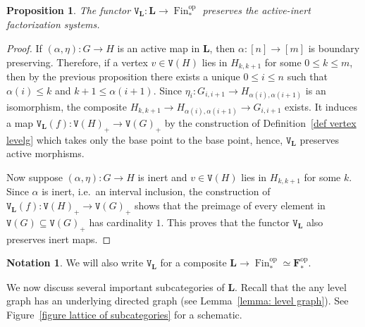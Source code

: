 \documentclass{amsart}
\numberwithin{theorem}{subsection}
\newtheorem{proposition}[theorem]{Proposition}
\theoremstyle{definition}
\newtheorem{notation}[theorem]{Notation}
\providecommand{\op}{\mathrm{op}}
\newcommand{\finset}{\operatorname{Fin}}
\newcommand{\pfinset}{\finset_*}
\newcommand{\finsetskel}{\mathbf{F}}
\newcommand{\pfinsetskel}{\finsetskel_*}
\newcommand{\levelg}{\mathbf{L}}
\newcommand{\vertex}{\mathtt{V}}
\begin{document}
\begin{proposition}\label{prop active inert bbG}
	The functor $\vertex_{\levelg}\colon \levelg\to \pfinset^\op$ preserves the active-inert factorization systems.
\end{proposition}
\begin{proof}
If $(\alpha,\eta)\colon G\to H$ is an active map in $\levelg$, then $\alpha\colon [n]\to [m]$ is boundary preserving.
Therefore, if a vertex $v\in \vertex(H)$ lies in $H_{k, k+1}$ for some $0\leq k\leq m$, then by the previous proposition there exists a unique $0\leq i\leq n$ such that $\alpha(i)\leq k$ and $k+1\leq \alpha(i+1)$.
Since $\eta_i\colon G_{i,i+1}\to H_{\alpha(i), \alpha(i+1)}$ is an isomorphism, the composite $H_{k,k+1}\to H_{\alpha(i), \alpha(i+1)}\to G_{i,i+1}$ exists. It induces a map $\vertex_\levelg(f) \colon \vertex(H)_+ \rightarrow \vertex(G)_+$ by the construction of Definition~\ref{def vertex levelg} which takes only the base point to the base point, hence, $\vertex_{\levelg}$ preserves active morphisms.

Now suppose $(\alpha,\eta)\colon G\to H$ is inert and $v\in \vertex(H)$ lies in $H_{k, k+1}$ for some $k$.
Since $\alpha$ is inert, i.e.\ an interval inclusion, the construction of $\vertex_\levelg(f) \colon \vertex(H)_+ \rightarrow \vertex(G)_+$ shows that the preimage of every element in $\vertex(G)\subseteq \vertex(G)_+$ has cardinality $1$.
This proves that the functor $\vertex_{\levelg}$ also preserves inert maps.
\end{proof}
\begin{notation}
		We will also write $\vertex_\levelg$ for a composite $\levelg\to \pfinset^\op\simeq \pfinsetskel^\op$.
\end{notation}

We now discuss several important subcategories of $\levelg$.
Recall that the any level graph has an underlying directed graph (see Lemma~\ref{lemma: level graph}).
See Figure~\ref{figure lattice of subcategories} for a schematic.
\end{document}
